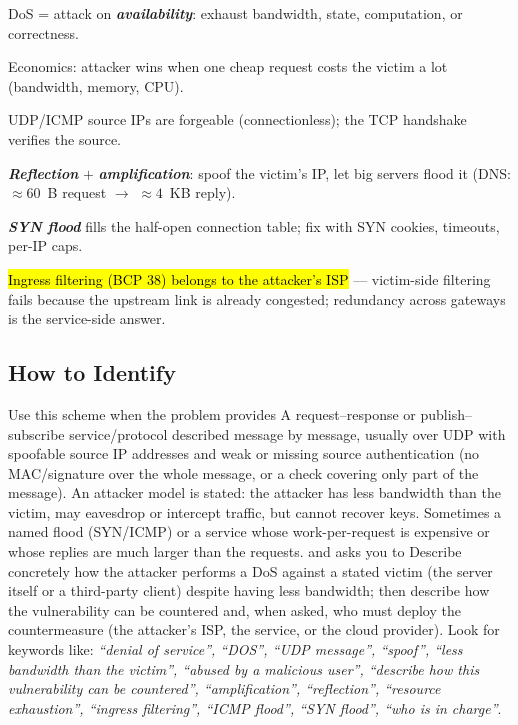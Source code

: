 \documentclass[12pt, a4paper]{article}
\newcommand{\term}[1]{\textbf{\textit{#1}}}        %
\newcommand{\imp}[1]{\hl{#1}}                       %
\begin{document}
\begin{theorybox}
\begin{tightitem}
    \item DoS = attack on \term{availability}: exhaust bandwidth, state, computation, or correctness.
    \item Economics: attacker wins when one cheap request costs the victim a lot (bandwidth, memory, CPU).
    \item UDP/ICMP source IPs are forgeable (connectionless); the TCP handshake verifies the source.
    \item \term{Reflection} $+$ \term{amplification}: spoof the victim's IP, let big servers flood it (DNS: $\approx 60$~B request $\rightarrow$ $\approx 4$~KB reply).
    \item \term{SYN flood} fills the half-open connection table; fix with SYN cookies, timeouts, per-IP caps.
    \item \imp{Ingress filtering (BCP 38) belongs to the attacker's ISP} --- victim-side filtering fails because the upstream link is already congested; redundancy across gateways is the service-side answer.
\end{tightitem}
\end{theorybox}

\subsection*{How to Identify}
Use this scheme when the problem provides A request--response or publish--subscribe service/protocol described message by message, usually over UDP with spoofable source IP addresses and weak or missing source authentication (no MAC/signature over the whole message, or a check covering only part of the message). An attacker model is stated: the attacker has less bandwidth than the victim, may eavesdrop or intercept traffic, but cannot recover keys. Sometimes a named flood (SYN/ICMP) or a service whose work-per-request is expensive or whose replies are much larger than the requests. and asks you to Describe concretely how the attacker performs a DoS against a stated victim (the server itself or a third-party client) despite having less bandwidth; then describe how the vulnerability can be countered and, when asked, who must deploy the countermeasure (the attacker's ISP, the service, or the cloud provider). Look for keywords like: \textit{``denial of service'', ``DOS'', ``UDP message'', ``spoof'', ``less bandwidth than the victim'', ``abused by a malicious user'', ``describe how this vulnerability can be countered'', ``amplification'', ``reflection'', ``resource exhaustion'', ``ingress filtering'', ``ICMP flood'', ``SYN flood'', ``who is in charge''}.
\end{document}
